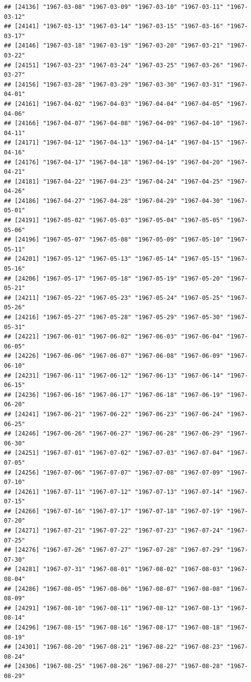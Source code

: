 \documentclass{article}\usepackage[]{graphicx}\usepackage[]{color}
\makeatletter
\newenvironment{kframe}{%
 \def\at@end@of@kframe{}%
 \ifinner\ifhmode%
  \def\at@end@of@kframe{\end{minipage}}%
  \begin{minipage}{\columnwidth}%
 \fi\fi%
 \def\FrameCommand##1{\hskip\@totalleftmargin \hskip-\fboxsep
 \colorbox{shadecolor}{##1}\hskip-\fboxsep
     \hskip-\linewidth \hskip-\@totalleftmargin \hskip\columnwidth}%
 \MakeFramed {\advance\hsize-\width
   \@totalleftmargin\z@ \linewidth\hsize
   \@setminipage}}%
 {\par\unskip\endMakeFramed%
 \at@end@of@kframe}
\newenvironment{knitrout}{}{} %
\makeatother
\begin{document}
\begin{description}
\begin{knitrout}
\begin{kframe}
\begin{verbatim}
## [24136] "1967-03-08" "1967-03-09" "1967-03-10" "1967-03-11" "1967-03-12"
## [24141] "1967-03-13" "1967-03-14" "1967-03-15" "1967-03-16" "1967-03-17"
## [24146] "1967-03-18" "1967-03-19" "1967-03-20" "1967-03-21" "1967-03-22"
## [24151] "1967-03-23" "1967-03-24" "1967-03-25" "1967-03-26" "1967-03-27"
## [24156] "1967-03-28" "1967-03-29" "1967-03-30" "1967-03-31" "1967-04-01"
## [24161] "1967-04-02" "1967-04-03" "1967-04-04" "1967-04-05" "1967-04-06"
## [24166] "1967-04-07" "1967-04-08" "1967-04-09" "1967-04-10" "1967-04-11"
## [24171] "1967-04-12" "1967-04-13" "1967-04-14" "1967-04-15" "1967-04-16"
## [24176] "1967-04-17" "1967-04-18" "1967-04-19" "1967-04-20" "1967-04-21"
## [24181] "1967-04-22" "1967-04-23" "1967-04-24" "1967-04-25" "1967-04-26"
## [24186] "1967-04-27" "1967-04-28" "1967-04-29" "1967-04-30" "1967-05-01"
## [24191] "1967-05-02" "1967-05-03" "1967-05-04" "1967-05-05" "1967-05-06"
## [24196] "1967-05-07" "1967-05-08" "1967-05-09" "1967-05-10" "1967-05-11"
## [24201] "1967-05-12" "1967-05-13" "1967-05-14" "1967-05-15" "1967-05-16"
## [24206] "1967-05-17" "1967-05-18" "1967-05-19" "1967-05-20" "1967-05-21"
## [24211] "1967-05-22" "1967-05-23" "1967-05-24" "1967-05-25" "1967-05-26"
## [24216] "1967-05-27" "1967-05-28" "1967-05-29" "1967-05-30" "1967-05-31"
## [24221] "1967-06-01" "1967-06-02" "1967-06-03" "1967-06-04" "1967-06-05"
## [24226] "1967-06-06" "1967-06-07" "1967-06-08" "1967-06-09" "1967-06-10"
## [24231] "1967-06-11" "1967-06-12" "1967-06-13" "1967-06-14" "1967-06-15"
## [24236] "1967-06-16" "1967-06-17" "1967-06-18" "1967-06-19" "1967-06-20"
## [24241] "1967-06-21" "1967-06-22" "1967-06-23" "1967-06-24" "1967-06-25"
## [24246] "1967-06-26" "1967-06-27" "1967-06-28" "1967-06-29" "1967-06-30"
## [24251] "1967-07-01" "1967-07-02" "1967-07-03" "1967-07-04" "1967-07-05"
## [24256] "1967-07-06" "1967-07-07" "1967-07-08" "1967-07-09" "1967-07-10"
## [24261] "1967-07-11" "1967-07-12" "1967-07-13" "1967-07-14" "1967-07-15"
## [24266] "1967-07-16" "1967-07-17" "1967-07-18" "1967-07-19" "1967-07-20"
## [24271] "1967-07-21" "1967-07-22" "1967-07-23" "1967-07-24" "1967-07-25"
## [24276] "1967-07-26" "1967-07-27" "1967-07-28" "1967-07-29" "1967-07-30"
## [24281] "1967-07-31" "1967-08-01" "1967-08-02" "1967-08-03" "1967-08-04"
## [24286] "1967-08-05" "1967-08-06" "1967-08-07" "1967-08-08" "1967-08-09"
## [24291] "1967-08-10" "1967-08-11" "1967-08-12" "1967-08-13" "1967-08-14"
## [24296] "1967-08-15" "1967-08-16" "1967-08-17" "1967-08-18" "1967-08-19"
## [24301] "1967-08-20" "1967-08-21" "1967-08-22" "1967-08-23" "1967-08-24"
## [24306] "1967-08-25" "1967-08-26" "1967-08-27" "1967-08-28" "1967-08-29"

\end{verbatim}
\end{kframe}
\end{knitrout}
\end{description}
\end{document}
